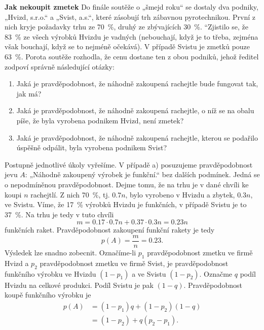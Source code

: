 \begin{mdframed}[style=mdexam]
  \begin{example}\label{mai:exam058}
    \textbf{Jak nekoupit zmetek}\newline
      Do finále soutěže o „šmejd roku“ se dostaly dva podniky, „Hvizd, s.r.o.“ a „Svist, a.s.“,
      které zásobují trh zábavnou pyrotechnikou. První z nich kryje požadavky trhu ze
      \SI{70}{\percent}, druhý ze zbývajících \SI{30}{\percent}. “Zjistilo se, že \SI{83}{\percent}
      ze všech výrobků Hvizdu je vadných (nebouchají, když je to třeba, zejména však bouchají, když
      se to nejméně očekává). V případě Svistu je zmetků pouze \SI{63}{\percent}. Porota soutěže
      rozhodla, že cenu dostane ten z obou podniků, jehož ředitel zodpoví správně následující
      otázky:
      \begin{enumerate}[noitemsep]
      \item Jaká je pravděpodobnost, že náhodně zakoupená rachejtle bude fungovat tak, jak má?
      \item Jaká je pravděpodobnost, že náhodně zakoupená rachejtle, o níž se na obalu píše, že byla
      vyrobena podnikem Hvizd, není zmetek?
      \item Jaká je pravděpodobnost, že náhodně zakoupená rachejtle, kterou se podařilo úspěšně
      odpálit, byla vyrobena podnikem Svist?
      \end{enumerate} 
      Postupně jednotlivé úkoly vyřešíme. V případě a) posuzujeme pravděpodobnost jevu \(A\):
      „Náhodně zakoupený výrobek je funkční.“ bez dalších podmínek. Jedná se o nepodmíněnou
      pravděpodobnost. Dejme tomu, že na trhu je v dané chvíli ke koupi \(n\) rachejtlí. Z nich
      \SI{70}{\percent}, tj. \(\num{0.7}n\), bylo vyrobeno v Hvizdu a zbytek, \(\num{0.3}n\), ve
      Svistu. Víme, že \SI{17}{\percent} výrobků Hvizdu je funkčních, v případě Svistu je to
      \SI{37}{\percent}. Na trhu je tedy v tuto chvíli
      \begin{equation*}
        m = \num{0.17}\cdot\num{0.7}n + \num{0.37}\cdot\num{0.3}n = \num{0.23}n
      \end{equation*}
      funkčních raket. Pravděpodobnost zakoupení funkční rakety je tedy
      \begin{equation*}
        p(A) = \dfrac{m}{n} = \num{0.23}.
      \end{equation*}
      Výsledek lze snadno zobecnit. Označíme-li \(p_1\) pravděpodobnost zmetku ve firmě Hvizd a
      \(p_2\) pravděpodobnost zmetku ve firmě Svist, je pravděpodobnost funkčního výrobku ve Hvizdu
      \((1 - p_1)\) a ve Svistu \((1 - p_2)\). Označme \(q\) podíl Hvizdu na celkové produkci. Podíl
      Svistu je pak \((1 - q)\). Pravděpodobnost koupě funkčního výrobku je
      \begin{align*}
        p(A) &= (1 - p_1)q + (1 - p_2)(1 - q)    \\
             &= (1 - p_2) + q(p_2 - p_1).
      \end{align*}
      

\end{example}
\end{mdframed}
